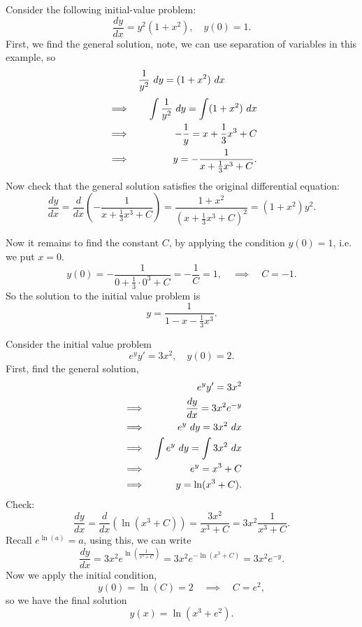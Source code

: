 \begin{example}
Consider the following initial-value problem:
\[\frac{dy}{dx}=y^2(1+x^2),\quad y(0)=1.\]
First, we find the general solution, note, we can use separation of variables in this example, so
\[\frac{1}{y^2}\dx[y]=(1+x^2)\dx\]
\begin{eqnarray*}
&\implies& \quad \int\frac{1}{y^2}\dx[y]=\int(1+x^2)\dx \\
&\implies& -\frac{1}{y}=x+\frac{1}{3}x^3+C \\
&\implies&\quad y=-\frac{1}{x+\frac{1}{3}x^3+C}.
\end{eqnarray*}
Now check that the general solution satisfies the original differential equation:
\[\frac{dy}{dx}=\frac{d}{dx}\left(-\frac{1}{x+\frac{1}{3}x^3+C}\right)=\frac{1+x^2}{\left(x+\frac{1}{3}x^3+C\right)^2}=(1+x^2)y^2.\]

Now it remains to find the constant $C$, by applying the condition $y(0)=1$, i.e. we put $x=0$.
\[y(0)=-\frac{1}{0+\frac{1}{3}\cdot0^3+C}=-\frac{1}{C}=1,\quad\implies\quad C=-1.\]
So the solution to the initial value problem is
\[y=\frac{1}{1-x-\frac{1}{3}x^3}.\]
\end{example}

\begin{example}
Consider the initial value problem
\[e^y y'=3x^2,\quad y(0)=2.\]
First, find the general solution,
\begin{eqnarray*}
&&e^y y'=3x^2 \\
&\implies& \frac{dy}{dx}=3x^2e^{-y} \\
&\implies& e^y\dx[y]=3x^2\dx \\
&\implies& \int e^y\dx[y]=\int 3x^2\dx \\
&\implies& e^y=x^3+C\\
&\implies& y=\ln(x^3+C).
\end{eqnarray*}
Check:
\[\frac{dy}{dx}=\frac{d}{dx}\left( \ln(x^3+C)\right)=\frac{3x^2}{x^3+C}=3x^2\frac{1}{x^3+C}.\]
Recall $e^{\ln(a)}=a$, using this, we can write
\[\frac{dy}{dx}=3x^2e^{\ln\left( \frac{1}{x^3+C}\right)}=3x^2e^{-\ln(x^3+C)}=3x^2e^{-y}.\]
Now we apply the initial condition,
\[y(0)=\ln(C)=2\quad \implies\quad C=e^2,\]
so we have the final solution
\[y(x)=\ln (x^3+e^2).\]
\end{example}

